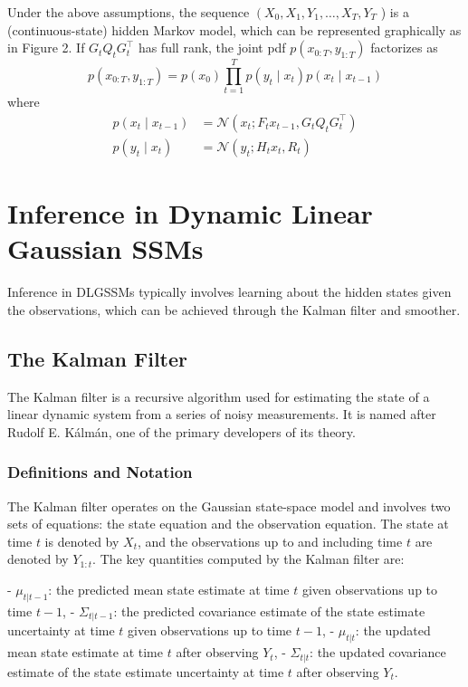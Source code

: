 \documentclass{article}
\begin{document}
Under the above assumptions, the sequence $\left(X_0, X_1, Y_1, \ldots, X_T, Y_T\right.$ ) is a (continuous-state) hidden Markov model, which can be represented graphically as in Figure 2. If $G_t Q_t G_t^{\top}$ has full rank, the joint pdf $p\left(x_{0: T}, y_{1: T}\right)$ factorizes as
$$
p\left(x_{0: T}, y_{1: T}\right)=p\left(x_0\right) \prod_{t=1}^T p\left(y_t \mid x_t\right) p\left(x_t \mid x_{t-1}\right)
$$
where
$$
\begin{aligned}
p\left(x_t \mid x_{t-1}\right) & =\mathcal{N}\left(x_t ; F_t x_{t-1}, G_t Q_t G_t^{\top}\right) \\
p\left(y_t \mid x_t\right) & =\mathcal{N}\left(y_t ; H_t x_t, R_t\right)
\end{aligned}
$$

\section{Inference in Dynamic Linear Gaussian SSMs}
Inference in DLGSSMs typically involves learning about the hidden states given the observations, which can be achieved through the Kalman filter and smoother.

\subsection{The Kalman Filter}

The Kalman filter is a recursive algorithm used for estimating the state of a linear dynamic system from a series of noisy measurements. It is named after Rudolf E. Kálmán, one of the primary developers of its theory.

\subsubsection{Definitions and Notation}

The Kalman filter operates on the Gaussian state-space model and involves two sets of equations: the state equation and the observation equation. The state at time \( t \) is denoted by \( X_t \), and the observations up to and including time \( t \) are denoted by \( Y_{1:t} \). The key quantities computed by the Kalman filter are:

- \( \mu_{t|t-1} \): the predicted mean state estimate at time \( t \) given observations up to time \( t-1 \),
- \( \Sigma_{t|t-1} \): the predicted covariance estimate of the state estimate uncertainty at time \( t \) given observations up to time \( t-1 \),
- \( \mu_{t|t} \): the updated mean state estimate at time \( t \) after observing \( Y_t \),
- \( \Sigma_{t|t} \): the updated covariance estimate of the state estimate uncertainty at time \( t \) after observing \( Y_t \).
\end{document}
